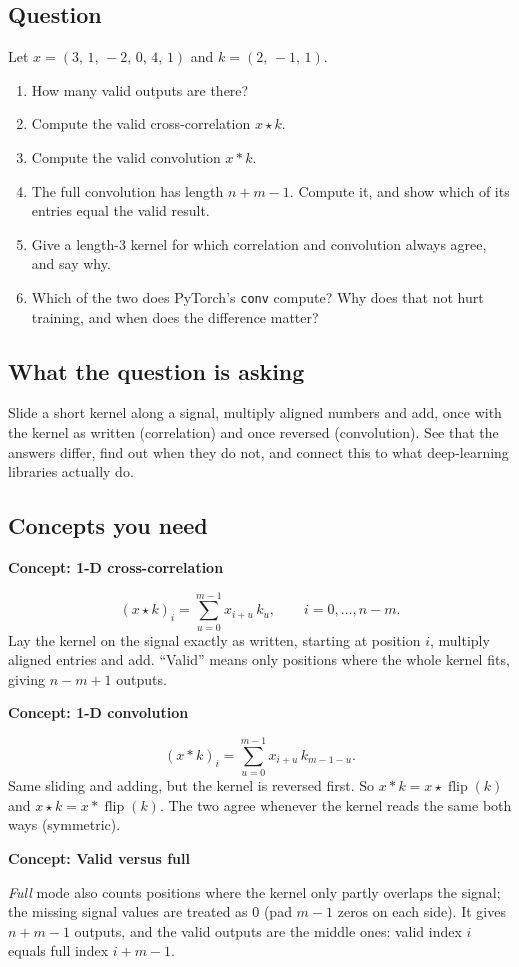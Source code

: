 \documentclass[12pt,a4paper]{article}
\newcommand{\concept}[2]{\par\medskip\phantomsection\label{#1}{\large\bfseries\color{blue!50!black} Concept: #2}\par}
\begin{document}
\subsection*{Question}
Let $x=(3,\,1,\,-2,\,0,\,4,\,1)$ and $k=(2,\,-1,\,1)$.
\begin{enumerate}[label=(\alph*)]
\item How many valid outputs are there?
\item Compute the valid cross-correlation $x\star k$.
\item Compute the valid convolution $x*k$.
\item The full convolution has length $n+m-1$. Compute it, and show which of its entries equal the valid result.
\item Give a length-3 kernel for which correlation and convolution always agree, and say why.
\item Which of the two does PyTorch's \texttt{conv} compute? Why does that not hurt training, and when does the difference matter?
\end{enumerate}

\subsection*{What the question is asking}
Slide a short kernel along a signal, multiply aligned numbers and add, once with the kernel as written (correlation) and once reversed (convolution). See that the answers differ, find out when they do not, and connect this to what deep-learning libraries actually do.

\subsection*{Concepts you need}

\concept{c:corr1d}{1-D cross-correlation}
\[
(x\star k)_i=\sum_{u=0}^{m-1}x_{i+u}\,k_u,\qquad i=0,\dots,n-m .
\]
Lay the kernel on the signal exactly as written, starting at position $i$, multiply aligned entries and add. ``Valid'' means only positions where the whole kernel fits, giving $n-m+1$ outputs.

\concept{c:conv1d}{1-D convolution}
\[
(x*k)_i=\sum_{u=0}^{m-1}x_{i+u}\,k_{m-1-u}.
\]
Same sliding and adding, but the kernel is reversed first. So $x*k=x\star\operatorname{flip}(k)$ and $x\star k=x*\operatorname{flip}(k)$. The two agree whenever the kernel reads the same both ways (symmetric).

\concept{c:fullconv}{Valid versus full}
\emph{Full} mode also counts positions where the kernel only partly overlaps the signal; the missing signal values are treated as 0 (pad $m-1$ zeros on each side). It gives $n+m-1$ outputs, and the valid outputs are the middle ones: valid index $i$ equals full index $i+m-1$.
\end{document}
